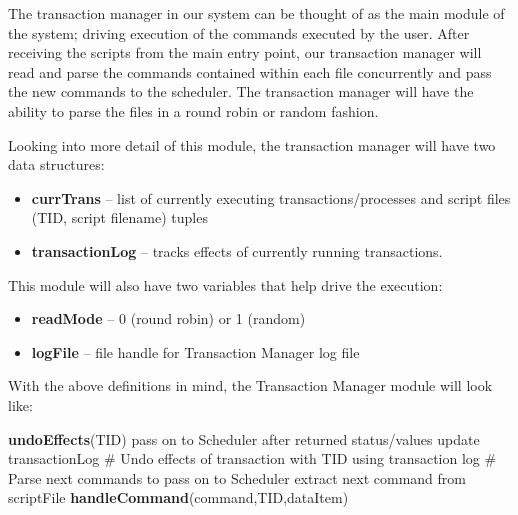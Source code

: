 The transaction manager in our system can be thought of as the main module of the system; driving execution of the commands executed by the user. After receiving the scripts from the main entry point, our transaction manager will read and parse the commands contained within each file concurrently and pass the new commands to the scheduler. The transaction manager will have the ability to parse the files in a round robin or random fashion. 

Looking into more detail of this module, the transaction manager will have two data structures: 

\begin{itemize}
\item \textbf{currTrans} -- list of currently executing transactions/processes and script files (TID, script filename) tuples
\item \textbf{transactionLog} --  tracks effects of currently running transactions.
\end{itemize}

This module will also have two variables that help drive the execution:

\begin{itemize}
\item \textbf{readMode} -- 0 (round robin) or 1 (random)
\item \textbf{logFile} -- file handle for Transaction Manager log file
\end{itemize}

With the above definitions in mind, the Transaction Manager module will look like:\\

\begin{mdframed}
\begin{algorithmic}[H]
    \State \textbf{undoEffects}(TID)
    \EndIf
   \State pass on to Scheduler
   \State after returned status/values
   \State update transactionLog
   \EndFunction
   \State
   \State  \# Undo effects of transaction with TID using transaction log
   \EndFunction
   \State
    \State  \# Parse next commands to pass on to Scheduler
    \State extract next command from scriptFile
    \State \textbf{handleCommand}(command,TID,dataItem)
    \EndFor
    \EndFunction
\end{algorithmic} 
\end{mdframed}